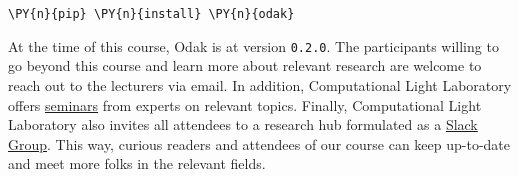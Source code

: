 \begin{tcolorbox}[breakable, size=fbox, boxrule=1pt, pad at break*=1mm,colback=cellbackground, colframe=cellborder]
\begin{Verbatim}[commandchars=\\\{\}]
\PY{n}{pip} \PY{n}{install} \PY{n}{odak}
\end{Verbatim}
\end{tcolorbox}

At the time of this course, Odak is at version \texttt{0.2.0}.
The participants willing to go beyond this course and learn more about relevant research are welcome to reach out to the lecturers via email.
In addition, Computational Light Laboratory offers \href{https://complightlab.com/seminars/}{seminars} from experts on relevant topics.
Finally, Computational Light Laboratory also invites all attendees to a research hub formulated as a \href{https://complightlab.com/research_hub/}{Slack Group}.
This way, curious readers and attendees of our course can keep up-to-date and meet more folks in the relevant fields.
